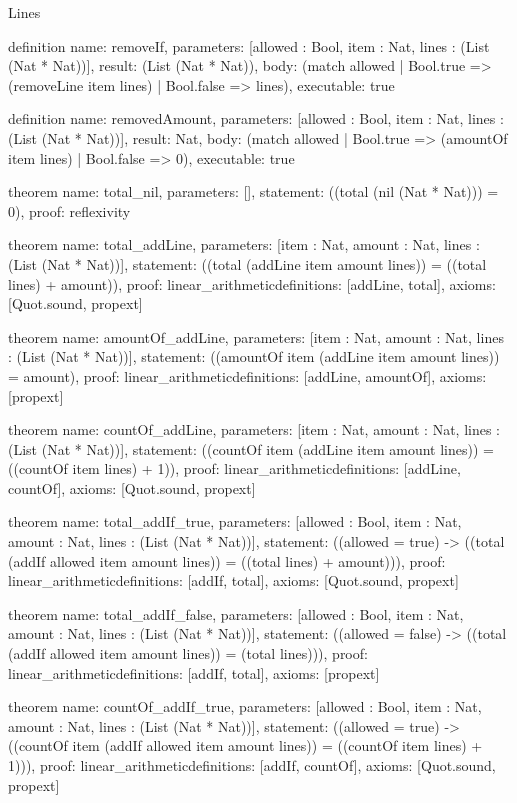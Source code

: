 \begin{lexlean}{Lines}
\begin{semanticmodule}
definition{
  name: removeIf,
  parameters: [allowed : Bool, item : Nat, lines : (List (Nat * Nat))],
  result: (List (Nat * Nat)),
  body: (match allowed | Bool.true => (removeLine item lines) | Bool.false => lines),
  executable: true
}

definition{
  name: removedAmount,
  parameters: [allowed : Bool, item : Nat, lines : (List (Nat * Nat))],
  result: Nat,
  body: (match allowed | Bool.true => (amountOf item lines) | Bool.false => 0),
  executable: true
}

theorem{
  name: total_nil,
  parameters: [],
  statement: ((total (nil (Nat * Nat))) = 0),
  proof: reflexivity{}
}

theorem{
  name: total_addLine,
  parameters: [item : Nat, amount : Nat, lines : (List (Nat * Nat))],
  statement: ((total (addLine item amount lines)) = ((total lines) + amount)),
  proof: linear_arithmetic{definitions: [addLine, total]},
  axioms: [Quot.sound, propext]
}

theorem{
  name: amountOf_addLine,
  parameters: [item : Nat, amount : Nat, lines : (List (Nat * Nat))],
  statement: ((amountOf item (addLine item amount lines)) = amount),
  proof: linear_arithmetic{definitions: [addLine, amountOf]},
  axioms: [propext]
}

theorem{
  name: countOf_addLine,
  parameters: [item : Nat, amount : Nat, lines : (List (Nat * Nat))],
  statement: ((countOf item (addLine item amount lines)) = ((countOf item lines) + 1)),
  proof: linear_arithmetic{definitions: [addLine, countOf]},
  axioms: [Quot.sound, propext]
}

theorem{
  name: total_addIf_true,
  parameters: [allowed : Bool, item : Nat, amount : Nat, lines : (List (Nat * Nat))],
  statement: ((allowed = true) -> ((total (addIf allowed item amount lines)) = ((total lines) + amount))),
  proof: linear_arithmetic{definitions: [addIf, total]},
  axioms: [Quot.sound, propext]
}

theorem{
  name: total_addIf_false,
  parameters: [allowed : Bool, item : Nat, amount : Nat, lines : (List (Nat * Nat))],
  statement: ((allowed = false) -> ((total (addIf allowed item amount lines)) = (total lines))),
  proof: linear_arithmetic{definitions: [addIf, total]},
  axioms: [propext]
}

theorem{
  name: countOf_addIf_true,
  parameters: [allowed : Bool, item : Nat, amount : Nat, lines : (List (Nat * Nat))],
  statement: ((allowed = true) -> ((countOf item (addIf allowed item amount lines)) = ((countOf item lines) + 1))),
  proof: linear_arithmetic{definitions: [addIf, countOf]},
  axioms: [Quot.sound, propext]
}


\end{semanticmodule}
\end{lexlean}
